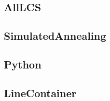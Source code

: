 \subsection{AllLCS}

\subsection{SimulatedAnnealing}

\subsection{Python}

\subsection{LineContainer}

